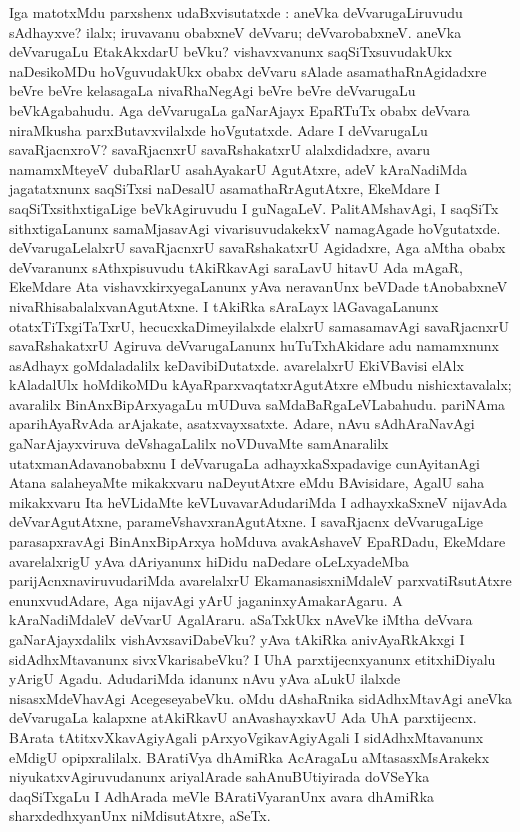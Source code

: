 Iga matotxMdu parxshenx udaBxvisutatxde : aneVka deVvarugaLiruvudu sAdhayxve? ilalx; iruvavanu obabxneV deVvaru; deVvarobabxneV. aneVka deVvarugaLu EtakAkxdarU beVku? vishavxvanunx saqSiTxsuvudakUkx naDesikoMDu hoVguvudakUkx obabx deVvaru sAlade asamathaRnAgidadxre beVre beVre kelasagaLa nivaRhaNegAgi beVre beVre deVvarugaLu beVkAga\-bahudu. Aga deVvarugaLa gaNarAjayx EpaRTuTx obabx deVvara niraMkusha parxButavxvilalxde hoVgutatxde. Adare I deVvarugaLu savaRjacnxroV? savaRjacnxrU savaRshakatxrU alalx\-didadxre, avaru namamxMteyeV dubaRlarU asahAyakarU AgutAtxre, adeV kAraNa\-diMda jagatatxnunx saqSiTxsi naDesalU asamathaRrAgutAtxre, EkeMdare I saqSiTxsithxtigaLige beVkAgiruvudu I guNagaLeV. PalitAMshavAgi, I saqSiTx sithxtigaLanunx samaMjasavAgi vivarisuvudakekxV namagAgade hoVgutatxde. deVvarugaLelalxrU savaRjacnxrU savaRshakatxrU Agidadxre, Aga aMtha obabx deVvaranunx sAthxpisuvudu tAkiRkavAgi saraLavU hitavU Ada mAgaR, EkeMdare Ata vishavxkirxyegaLanunx yAva neravanUnx beVDade tAnobabxneV nivaR\-hisabalalxvanAgutAtxne. I tAkiRka sAraLayx lAGavagaLanunx otatxTiTxgiTaTxrU, hecucxkaDime\-yilalxde elalxrU samasamavAgi savaRjacnxrU savaRshakatxrU Agiruva deVvarugaLanunx huTuTxhAkidare adu namamxnunx asAdhayx goMdaladalilx keDavibiDutatxde. avarelalxrU EkiV\-Bavisi elAlx kAladalUlx hoMdikoMDu kAyaRparxvaqtatxrAgutAtxre eMbudu nishicxtavalalx; avaralilx BinAnxBipArxyagaLu mUDuva saMdaBaRgaLeVLabahudu. pariNAma apari\-hAyaRvAda arAjakate, asatxvayxsatxte. Adare, nAvu sAdhAraNavAgi gaNarAjayx\-viruva deVshagaLalilx noVDuvaMte samAnaralilx utatxmanAdavanobabxnu I deVvarugaLa adhayxkaSx\-padavige cunAyitanAgi Atana salaheyaMte mikakxvaru naDeyutAtxre eMdu BAvisi\-dare, AgalU saha mikakxvaru Ita heVLidaMte keVLuvavarAdudariMda I adhayxkaSxneV nija\-vAda deVvarAgutAtxne, parameVshavxranAgutAtxne. I savaRjacnx deVvarugaLige parasapxra\-vAgi BinAnxBipArxya hoMduva avakAshaveV EpaRDadu, EkeMdare avarelalxrigU yAva dAriyanunx hiDidu naDedare oLeLxyadeMba parijAcnxnaviruvudariMda avarelalxrU Eka\-manasisxniMdaleV parxvatiRsutAtxre enunxvudAdare, Aga nijavAgi yArU jaganinx\-yAmaka\-rAgaru. A kAraNadiMdaleV deVvarU AgalAraru. aSaTxkUkx nAveVke iMtha deVvara gaNarAjayxdalilx vishAvxsaviDabeVku? yAva tAkiRka anivAyaRkAkxgi I sidAdhxMtavanunx sivxVkarisabeVku? I UhA parxtijecnxyanunx etitxhiDiyalu yArigU Agadu. Aduda\-riMda idanunx nAvu yAva aLukU ilalxde nisasxMdeVhavAgi AcegeseyabeVku. oMdu dAshaRnika sidAdhxMtavAgi aneVka deVvarugaLa kalapxne atAkiRkavU anAvashayxkavU Ada UhA parxtijecnx. BArata tAtitxvXkavAgiyAgali pArxyoVgikavAgiyAgali I sidAdhxMta\-vanunx eMdigU opipxralilalx. BAratiVya dhAmiRka AcAragaLu aMtasasxMsArakekx niyukatx\-vAgiruvudanunx ariyalArade sahAnuBUtiyirada doVSeYka daqSiTxgaLu I AdhArada meVle BAratiVyaranUnx avara dhAmiRka sharxdedhxyanUnx niMdisutAtxre, aSeTx.

